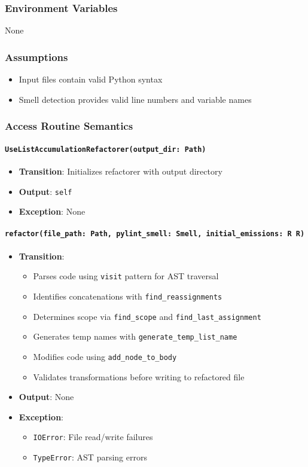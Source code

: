 \documentclass[12pt, titlepage]{article}
\begin{document}
  \subsubsection{Environment Variables}
  None
  
  \subsubsection{Assumptions}
  \begin{itemize}
  \item Input files contain valid Python syntax
  \item Smell detection provides valid line numbers and variable names
  \end{itemize}
  
  \subsubsection{Access Routine Semantics}
  
  \paragraph{\texttt{UseListAccumulationRefactorer(output\_dir: Path)}}
  \begin{itemize}
  \item \textbf{Transition}: Initializes refactorer with output directory
  \item \textbf{Output}: \texttt{self}
  \item \textbf{Exception}: None
  \end{itemize}
  
  \paragraph{\texttt{refactor(file\_path: Path, pylint\_smell: Smell, initial\_emissions: 
  R
  R)}}
  \begin{itemize}
  \item \textbf{Transition}:
  \begin{itemize}
  \item Parses code using \texttt{visit} pattern for AST traversal
  \item Identifies concatenations with \texttt{find\_reassignments}
  \item Determines scope via \texttt{find\_scope} and \texttt{find\_last\_assignment}
  \item Generates temp names with \texttt{generate\_temp\_list\_name}
  \item Modifies code using \texttt{add\_node\_to\_body}
  \item Validates transformations before writing to refactored file
  \end{itemize}
  \item \textbf{Output}: None
  \item \textbf{Exception}:
  \begin{itemize}
  \item \texttt{IOError}: File read/write failures
  \item \texttt{TypeError}: AST parsing errors
  \end{itemize}
  \end{itemize}
  
\end{document}
